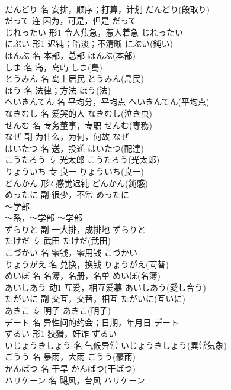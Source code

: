 \documentclass[8pt]{extreport}
\begin{document}
\begin{CJK}{UTF8}{min}
\\	だんどり	名	安排，顺序；打算，计划	だんどり(段取り)	
\\	だって	连	因为，可是，但是	だって	
\\	じれったい	形1	令人焦急，惹人着急	じれったい	
\\	にぶい	形1	迟钝；暗淡；不清晰	にぶい(鈍い)	
\\	ほんぶ	名	本部，总部	ほんぶ(本部)	
\\	しま	名	岛，岛屿	しま(島)	
\\	とうみん	名	岛上居民	とうみん(島民)	
\\	ほう	名	法律；方法	ほう(法)	
\\	へいきんてん	名	平均分，平均点	へいきんてん(平均点)	
\\	なきむし	名	爱哭的人	なきむし(泣き虫)	
\\	せんむ	名	专务董事，专职	せんむ(専務)	
\\	なぜ	副	为什么，为何，何故	なぜ	
\\	はいたつ	名	送，投递	はいたつ(配達)	
\\	こうたろう	专	光太郎	こうたろう(光太郎)	
\\	りょういち	专	良一	りょういち(良一)	
\\	どんかん	形2	感觉迟钝	どんかん(鈍感)	
\\	めったに	副	很少，不常	めったに	
\\	～学部	
\\	～系，～学部	～学部	
\\	ずらりと	副	一大排，成排地	ずらりと	
\\	たけだ	专	武田	たけだ(武田)	
\\	こづかい	名	零钱，零用钱	こづかい	
\\	りょうがえ	名	兑换，换钱	りょうがえ(両替)	
\\	めいぼ	名	名簿，名册，名单	めいぼ(名簿)	
\\	あいしあう	动1	互爱，相互爱慕	あいしあう(愛し合う)	
\\	たがいに	副	交互，交替，相互	たがいに(互いに)	
\\	あきこ	专	明子	あきこ(明子)	
\\	デート	名	异性间的约会；日期，年月日	デート	
\\	ずるい	形1	狡猾，奸诈	ずるい	
\\	いじょうきしょう	名	气候异常	いじょうきしょう(異常気象)	
\\	ごうう	名	暴雨，大雨	ごうう(豪雨)	
\\	かんばつ	名	干旱	かんばつ(干ばつ)	
\\	ハリケーン	名	飓风，台风	ハリケーン	

\end{CJK}
\end{document}
